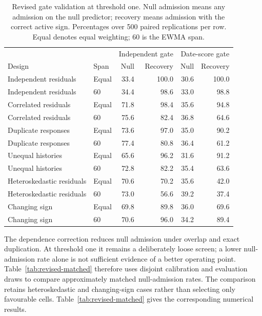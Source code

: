 \documentclass[11pt,a4paper]{article}
\begin{document}
\begin{table}[htbp]
\centering\small
\caption{Revised gate validation at threshold one. Null admission means any admission
on the null predictor; recovery means admission with the correct active sign.
Percentages over 500 paired replications per row. Equal denotes equal weighting;
60 is the EWMA span.}\label{tab:revised-gate}
\begin{tabular}{llrrrr}\toprule
 & & \multicolumn{2}{c}{Independent gate} & \multicolumn{2}{c}{Date-score gate}\\
Design & Span & Null & Recovery & Null & Recovery\\\midrule
Independent residuals & Equal & 33.4 & 100.0 & 30.6 & 100.0 \\
Independent residuals & 60 & 34.4 & 98.6 & 33.0 & 98.8 \\
Correlated residuals & Equal & 71.8 & 98.4 & 35.6 & 94.8 \\
Correlated residuals & 60 & 75.6 & 82.4 & 36.8 & 64.6 \\
Duplicate responses & Equal & 73.6 & 97.0 & 35.0 & 90.2 \\
Duplicate responses & 60 & 77.4 & 80.8 & 36.4 & 61.2 \\
Unequal histories & Equal & 65.6 & 96.2 & 31.6 & 91.2 \\
Unequal histories & 60 & 72.8 & 82.2 & 35.4 & 63.6 \\
Heteroskedastic residuals & Equal & 70.6 & 70.2 & 35.6 & 42.0 \\
Heteroskedastic residuals & 60 & 73.0 & 56.6 & 39.2 & 37.4 \\
Changing sign & Equal & 69.8 & 89.8 & 36.0 & 69.6 \\
Changing sign & 60 & 70.6 & 96.0 & 34.2 & 89.4 \\
\bottomrule\end{tabular}
\end{table}

The dependence correction reduces null admission under overlap and exact
duplication. At threshold one it remains a deliberately loose screen; a lower
null-admission rate alone is not sufficient evidence of a better operating point.
Table~\ref{tab:revised-matched} therefore uses disjoint calibration and
evaluation draws to compare approximately matched null-admission rates. The
comparison retains heteroskedastic and changing-sign cases rather than selecting
only favourable cells.
\noindent Table~\ref{tab:revised-matched} gives the corresponding numerical results.
\end{document}
